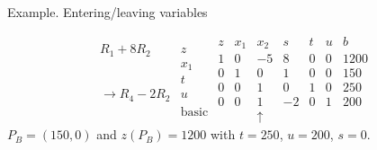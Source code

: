 \documentclass[c]{beamer}
\begin{document}

\begin{frame}{Example. Entering/leaving variables}

\begin{equation*}
\begin{array}{cc}
&\\
R_1+8R_2&z \\
&x_1 \\
&t \\
\rightarrow R_4-2R_2&u\\
&\mathrm{basic} \\
\end{array}
\begin{array}{c|ccccc|c}
  z & x_1 & x_2 & s & t & u & b \\ \hline
  1 & 0 & -5 & 8 & 0 & 0 & 1200 \\ \hline
  0 & 1 & 0 & 1 & 0 & 0 & 150  \\
  0 & 0 & 1 & 0 & 1 & 0 & 250 \\
  0 & 0 & 1 & -2 & 0 & 1 & 200 \\
    &  & \uparrow& & & &
\end{array}
\end{equation*}
$P_B=(150,0)$ and $z(P_B)=1200$ with $t=250$, $u=200$, $s=0$.
\end{frame}
\end{document}

